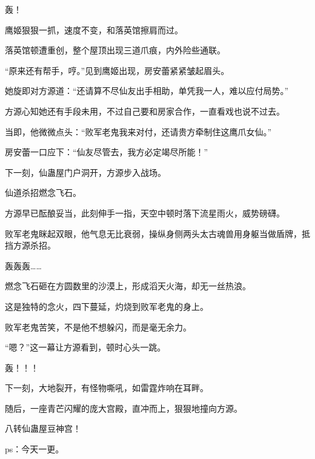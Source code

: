 \begin{this_body}
轰！

鹰姬狠狠一抓，速度不变，和落英馆擦肩而过。

落英馆顿遭重创，整个屋顶出现三道爪痕，内外险些通联。

“原来还有帮手，哼。”见到鹰姬出现，房安蕾紧紧皱起眉头。

她旋即对方源道：“还请算不尽仙友出手相助，单凭我一人，难以应付局势。”

方源心知她还有手段未用，不过自己要和房家合作，一直看戏也说不过去。

当即，他微微点头：“败军老鬼我来对付，还请贵方牵制住这鹰爪女仙。”

房安蕾一口应下：“仙友尽管去，我方必定竭尽所能！”

下一刻，仙蛊屋门户洞开，方源步入战场。

仙道杀招燃念飞石。

方源早已酝酿妥当，此刻伸手一指，天空中顿时落下流星雨火，威势磅礴。

败军老鬼眯起双眼，他气息无比衰弱，操纵身侧两头太古魂兽用身躯当做盾牌，抵挡方源杀招。

轰轰轰……

燃念飞石砸在方圆数里的沙漠上，形成滔天火海，却无一丝热浪。

这是独特的念火，四下蔓延，灼烧到败军老鬼的身上。

败军老鬼苦笑，不是他不想躲闪，而是毫无余力。

“嗯？”这一幕让方源看到，顿时心头一跳。

轰！！！

下一刻，大地裂开，有怪物嘶吼，如雷霆炸响在耳畔。

随后，一座青芒闪耀的庞大宫殿，直冲而上，狠狠地撞向方源。

八转仙蛊屋豆神宫！

ps：今天一更。

\end{this_body}

